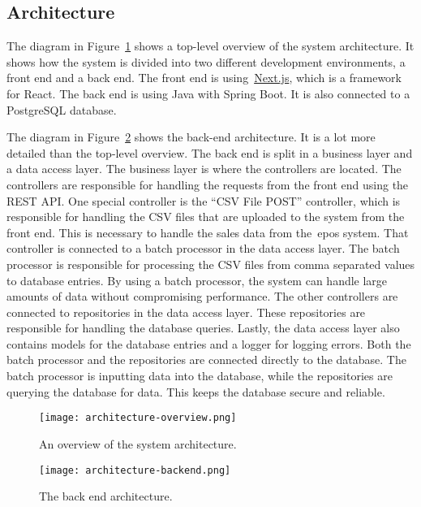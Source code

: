\subsection{Architecture}\label{subsec:architecture}

The diagram in Figure~\ref{fig:architecture-overview} shows a top-level overview of the system architecture.
It shows how the system is divided into two different development environments, a front end and a back end.
The front end is using~\url{Next.js}, which is a framework for React.
The back end is using Java with Spring Boot.
It is also connected to a PostgreSQL database.

The diagram in Figure~\ref{fig:architecture-backend} shows the back-end architecture.
It is a lot more detailed than the top-level overview.
The back end is split in a business layer and a data access layer.
The business layer is where the controllers are located.
The controllers are responsible for handling the requests from the front end using the REST API.\@
One special controller is the ``CSV File POST'' controller, which is responsible for handling the CSV files that
are uploaded to the system from the front end.
This is necessary to handle the sales data from the~\acrshort{epos} system.
That controller is connected to a batch processor in the data access layer.
The batch processor is responsible for processing the CSV files from comma separated values to database entries.
By using a batch processor, the system can handle large amounts of data without compromising performance.
The other controllers are connected to repositories in the data access layer.
These repositories are responsible for handling the database queries.
Lastly, the data access layer also contains models for the database entries and a logger for logging errors.
Both the batch processor and the repositories are connected directly to the database.
The batch processor is inputting data into the database, while the repositories are querying the database for data.
This keeps the database secure and reliable.

\begin{figure}[h]
    \centering
    \texttt{[image: architecture-overview.png]}
    \caption{An overview of the system architecture.
    }\label{fig:architecture-overview}
\end{figure}

\begin{figure}[h]
    \centering
    \texttt{[image: architecture-backend.png]}
    \caption{The back end architecture.
    }\label{fig:architecture-backend}
\end{figure}
